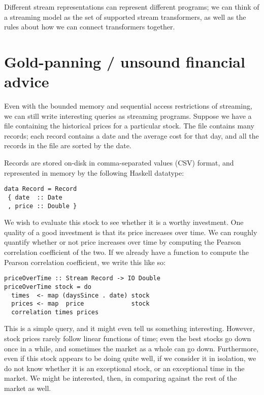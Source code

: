  Different stream representations can represent different programs; we can think of a streaming model as the set of supported stream transformers, as well as the rules about how we can connect transformers together.


\section{Gold-panning / unsound financial advice}
Even with the bounded memory and sequential access restrictions of streaming, we can still write interesting queries as streaming programs.
Suppose we have a file containing the historical prices for a particular stock.
The file contains many records; each record contains a date and the average cost for that day, and all the records in the file are sorted by the date.

Records are stored on-disk in comma-separated values (CSV) format, and represented in memory by the following Haskell datatype:

\begin{lstlisting}
data Record = Record
 { date  :: Date
 , price :: Double }
\end{lstlisting}

We wish to evaluate this stock to see whether it is a worthy investment.
One quality of a good investment is that its price increases over time.
We can roughly quantify whether or not price increases over time by computing the Pearson correlation coefficient of the two.
If we already have a function to compute the Pearson correlation coefficient, we write this like so:

\begin{lstlisting}
priceOverTime :: Stream Record -> IO Double
priceOverTime stock = do
  times  <- map (daysSince . date) stock
  prices <- map  price             stock
  correlation times prices
\end{lstlisting}

This is a simple query, and it might even tell us something interesting.
However, stock prices rarely follow linear functions of time; even the best stocks go down once in a while, and sometimes the market as a whole can go down.
Furthermore, even if this stock appears to be doing quite well, if we consider it in isolation, we do not know whether it is an exceptional stock, or an exceptional time in the market.
We might be interested, then, in comparing against the rest of the market as well.

